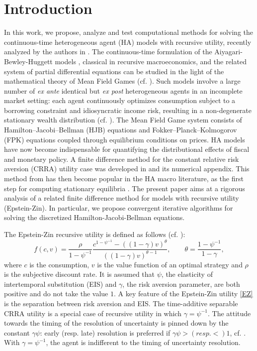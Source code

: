 \documentclass[11pt]{article}
\numberwithin{equation}{section}
\numberwithin{algorithm}{section}
\newcommand{\g}{\gamma}
\newcommand{\p}{\psi}
\theoremstyle{plain}
\begin{document}
\section{Introduction}
In this work, we propose, analyze and test computational methods for solving the continuous-time heterogeneous agent (HA) models with recursive utility, recently analyzed by the authors in \cite{Achdou:2026aa}.  The continuous-time formulation of the Aiyagari-Bewley-Huggett models \cite{ljungqvist2018recursive}, classical in recursive macroeconomics, and the related system of partial differential equations can be studied in the light of the mathematical theory of Mean Field Games (cf. \cite{MR2679575,achdou2021mean,MR2295621}). Such models involve a large number of \textit{ex ante} identical but \textit{ex post} heterogeneous agents in an incomplete market setting: each agent continuously optimizes consumption subject to a borrowing constraint and idiosyncratic income risk, resulting in a non-degenerate stationary wealth distribution (cf. \cite[(1.1)]{Achdou:2026aa}). The Mean Field Game system consists of Hamilton--Jacobi--Bellman (HJB) equations and Fokker--Planck--Kolmogorov (FPK) equations coupled through equilibrium conditions on prices. HA models have now become indispensable for quantifying the distributional effects of fiscal and monetary policy. A finite difference method for the constant relative risk aversion (CRRA) utility case was developed in \cite{achdou2022income} and its numerical appendix. This method from \cite{achdou2022income} has then become popular in the HA macro literature, as the first step for computing stationary equilibria \cite{ahn2018inequality,bilal2023solving,fernandez2023financial,gu2024global,kaplan2018monetary}. The present paper aims at a rigorous analysis of a related finite difference method for models with recursive utility (Epstein-Zin). In particular, we propose convergent iterative algorithms for solving the discretized Hamilton-Jacobi-Bellman equations. \par
The Epstein-Zin recursive utility is defined as follows (cf. \cite{wang2016optimal}):
       \begin{equation}
         \label{EZ}
       f(c,v)=\frac{\rho}{1-\p^{-1}}\frac{c^{1-\p^{-1}}-((1-\g)v)^\theta}{((1-\g)v)^{\theta-1}},\qquad \theta=\frac{1-\p^{-1}}{1-\g},
       \end{equation}
       where $c$ is the consumption, $v$ is the value function of an optimal strategy and $\rho$ is the subjective discount rate. It is assumed that $\p$, the elasticity of intertemporal substitution (EIS) and $\g$, the risk aversion parameter, are both positive and do not take the value $1$. A key feature of the Epstein-Zin utility \eqref{EZ} is the separation between risk aversion and EIS. The time-additive separable CRRA utility is a special case of recursive utility in which $\g=\psi^{-1}$.  The attitude towards the timing of the resolution of uncertainty is pinned down by the constant $\g \p$: early (resp. late) resolution is preferred if $\g \p> (resp. <) 1$, cf. \cite{EZ1989}. With $\g=\psi^{-1}$, the agent is indifferent to the timing of uncertainty resolution.\par
\end{document}

